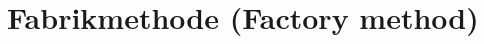 \documentclass{lehramt-informatik-haupt}
\begin{document}

\chapter{Fabrikmethode (Factory method)}

\begin{liQuellen}
\item \cite[PDF Seite 93-100]{gof}
\end{liQuellen}

\liEntwurfsFabrikmethodeUml

\literatur
\end{document}
